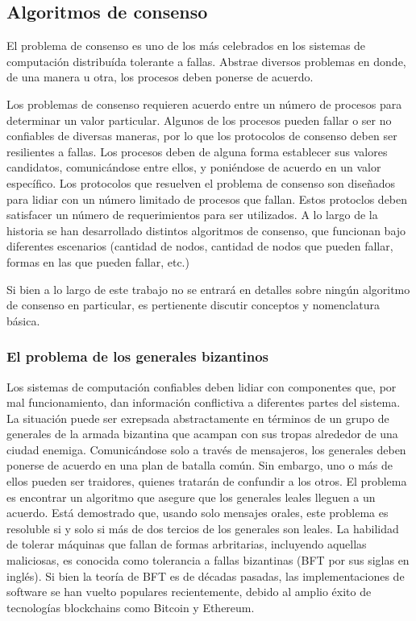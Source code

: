 

\subsection{Algoritmos de consenso}\label{subsubsec:consensus}
El problema de consenso es uno de los más celebrados en los sistemas de computación distribuída tolerante a fallas.
%
Abstrae diversos problemas en donde, de una manera u otra, los procesos deben ponerse de acuerdo.
%

Los problemas de consenso requieren acuerdo entre un número de procesos para determinar un valor particular.
%
Algunos de los procesos pueden fallar o ser no confiables de diversas maneras, por lo que los protocolos de
consenso deben ser resilientes a fallas.
%
Los procesos deben de alguna forma establecer sus valores candidatos, comunicándose entre ellos, y
poniéndose de acuerdo en un valor específico.
%
Los protocolos que resuelven el problema de consenso son diseñados para lidiar con un número limitado de procesos
que fallan.
%
Estos protoclos deben satisfacer un número de requerimientos para ser utilizados.
%
A lo largo de la historia se han desarrollado distintos algoritmos de consenso, que funcionan bajo diferentes
escenarios (cantidad de nodos, cantidad de nodos que pueden fallar, formas en las que pueden fallar, etc.)

%

Si bien a lo largo de este trabajo no se entrará en detalles sobre ningún algoritmo de consenso en particular,
es pertienente discutir conceptos y nomenclatura básica.

\subsubsection{El problema de los generales bizantinos}

Los sistemas de computación confiables deben lidiar con componentes que, por mal funcionamiento,
dan información conflictiva a diferentes partes del sistema. La situación puede ser exrepsada abstractamente
en términos de un grupo de generales de la armada bizantina que acampan con sus tropas alrededor de una
ciudad enemiga. Comunicándose solo a través de mensajeros, los generales deben ponerse de acuerdo en una plan
de batalla común. Sin embargo, uno o más de ellos pueden ser traidores, quienes tratarán de confundir a los
otros. El problema es encontrar un algoritmo que asegure que los generales leales lleguen a un acuerdo.
Está demostrado que, usando solo mensajes orales, este problema es resoluble si y solo si más de dos tercios
de los generales son leales.
La habilidad de tolerar máquinas que fallan de formas arbritarias, incluyendo aquellas maliciosas,
es conocida como tolerancia a fallas bizantinas (BFT por sus siglas en inglés). Si bien la teoría de
BFT es de décadas pasadas, las implementaciones de software se han vuelto populares recientemente,
debido al amplio éxito de tecnologías blockchains como Bitcoin y Ethereum.

